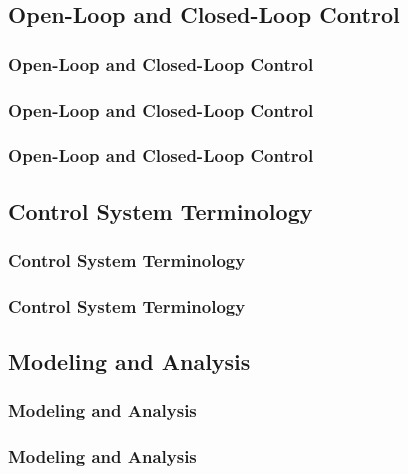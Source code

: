 \documentclass[fleqn]{beamer} %
\newcommand{\sectionIsubsectionItitle}{Open-Loop and Closed-Loop Control}
\newcommand{\sectionIsubsectionIItitle}{Control System Terminology}
\newcommand{\sectionIsubsectionIIItitle}{Modeling and Analysis}
\begin{document}
		\subsection{\sectionIsubsectionItitle}\label{sectionIsubsectionI}

			\begin{frame}
				\frametitle{\sectionIsubsectionItitle}
				\bigskip

				\btVFill
			\end{frame}

			\begin{frame}
				\frametitle{\sectionIsubsectionItitle}
				\bigskip

 
				\btVFill
			\end{frame}

			\begin{frame}
				\frametitle{\sectionIsubsectionItitle}
				\bigskip


				\btVFill
			\end{frame}

		



		\subsection{\sectionIsubsectionIItitle}\label{sectionIsubsectionII}

			\begin{frame}
				\frametitle{\sectionIsubsectionIItitle}
				\bigskip

				\btVFill
			\end{frame}

			\begin{frame}
				\frametitle{\sectionIsubsectionIItitle}
				\bigskip

				
				\btVFill
			\end{frame}

		\subsection{\sectionIsubsectionIIItitle}\label{sectionIsubsectionIII}
			\begin{frame} 
				\frametitle{\sectionIsubsectionIIItitle}
				\bigskip

				\btVFill
			\end{frame}	

			\begin{frame} 
				\frametitle{\sectionIsubsectionIIItitle}
				\bigskip

				\btVFill
			\end{frame}	
\end{document}
